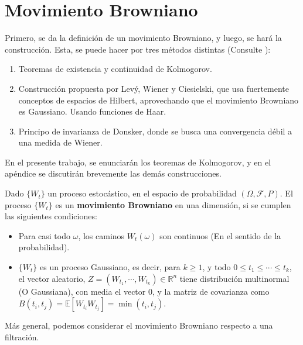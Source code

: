 \section{Movimiento Browniano}

Primero, se da la definición de un movimiento Browniano, y luego, se hará la construcción. Esta, se puede hacer por tres métodos distintas (Consulte \cite{Brownian_Motion_Karatzas}):

\begin{enumerate}
	\item Teoremas de existencia y continuidad de Kolmogorov.
	\item Construcción propuesta por Levý, Wiener y Ciesielski, que usa fuertemente conceptos de espacios de Hilbert, aprovechando que el movimiento Browniano es Gaussiano. Usando funciones de Haar.
	\item Principo de invarianza de Donsker, donde se busca una convergencia débil a una medida de Wiener.
\end{enumerate}

En el presente trabajo, se enunciarán los teoremas de Kolmogorov, y en el apéndice se discutirán brevemente las demás construcciones.

\begin{boxDef}
	Dado $\{ W_t \}$ un proceso estocástico, en el espacio de probabilidad $(\Omega, \mathcal{F}, P)$. El proceso $\{ W_t \}$ es un \textbf{movimiento Browniano} en una dimensión, si se cumplen las siguientes condiciones:

	\begin{itemize}
		\item Para casi todo $\omega$, los caminos $W_t (\omega)$ son continuos (En el sentido de la probabilidad).
		\item $\{ W_t \}$ es un proceso Gaussiano, es decir, para $k \geq 1$, y todo $0 \leq t_1 \leq \cdots \leq t_k$, el vector aleatorio, $Z = (W_{t_1}, \cdots, W_{t_k}) \in \mathbb{R}^{n}$ tiene distribución multinormal (O Gaussiana), con media el vector $0$, y la matriz de covarianza como $B(t_i, t_j) = \mathbb{E}[W_{t_i} W_{t_j}] = \min(t_i, t_j)$.
	\end{itemize}

\end{boxDef}

Más general, podemos considerar el movimiento Browniano respecto a una filtración.

